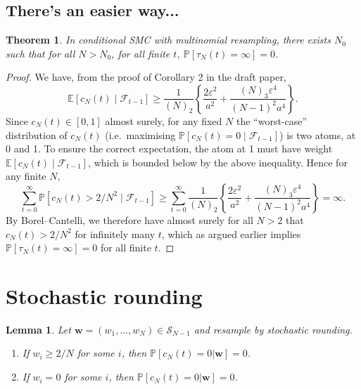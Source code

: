 \documentclass{article}
\newtheorem{thm}{Theorem}
\newtheorem{lemma}{Lemma}
\newcommand{\PR}{\mathbb{P}}
\newcommand{\E}{\mathbb{E}}
\newcommand{\1}[1]{\mathbb{I}_{#1}}
\begin{document}
\subsection*{There's an easier way...}

\begin{thm}
In conditional SMC with multinomial resampling, there exists $N_0$ such that for all $N>N_0$, for all finite $t$, $\PR[\tau_N(t) = \infty] =0$.
\end{thm}

\begin{proof}
We have, from the proof of Corollary 2 in the draft paper,
\begin{equation*}
\E [c_N(t) \mid \mathcal{F}_{t-1}] \geq \frac{1}{(N)_2} \left\{ \frac{2\varepsilon^2}{a^2} + \frac{(N)_3 \varepsilon^4}{(N-1)^2 a^4} \right\} .
\end{equation*}
Since $c_N(t) \in [0,1]$ almost surely, for any fixed $N$ the ``worst-case'' distribution of $c_N(t)$ (i.e.\ maximising $\PR[c_N(t)=0 \mid \mathcal{F}_{t-1}]$) is two atoms, at 0 and 1. To ensure the correct expectation, the atom at 1 must have weight $\E[c_N(t) \mid \mathcal{F}_{t-1}]$, which is bounded below by the above inequality.
Hence for any finite $N$,
\begin{equation*}
\sum_{t=0}^\infty \PR[ c_N(t) > 2/N^2 \mid \mathcal{F}_{t-1}] 
\geq \sum_{t=0}^\infty \frac{1}{(N)_2} \left\{ \frac{2\varepsilon^2}{a^2} + \frac{(N)_3 \varepsilon^4}{(N-1)^2 a^4} \right\}
= \infty .
\end{equation*}
By Borel--Cantelli, we therefore have almost surely for all $N>2$ that $c_N(t) > 2/N^2$ for infinitely many $t$, which as argued earlier implies $\PR[\tau_N(t) = \infty] =0$ for all finite $t$.
\end{proof}


\section*{Stochastic rounding}
\begin{lemma} \label{lem:extreme_w_coal_as}
Let $\mathbf{w} = (w_1,\dots,w_N) \in \mathcal{S}_{N-1}$ and resample by stochastic rounding.
\begin{enumerate}[label=(\roman*)]
\item If $w_i \geq 2/N$ for some $i$, then $\PR[c_N(t) =0 |\mathbf{w} ] =0$. \label{item:SR_weight_2}
\item If $w_i= 0$ for some $i$, then $\PR[c_N(t) =0 |\mathbf{w} ] =0$. \label{item:SR_weight_0}
\end{enumerate}
\end{lemma}
\end{document}
